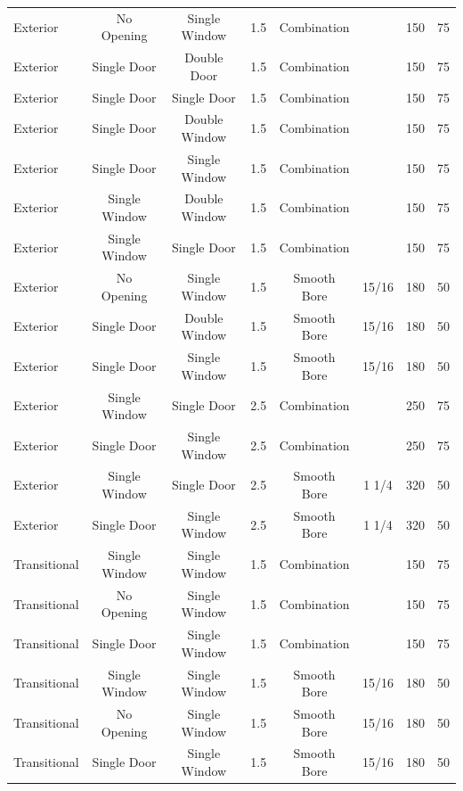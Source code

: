\documentclass[12pt,oneside]{book}
\begin{document}
\begin{table}[!ht]
\begin{tabular}{lccccccc}
Exterior & No Opening & Single Window & 1.5 & Combination &  & 150 & 75 \\
Exterior & Single Door & Double Door & 1.5 & Combination &  & 150 & 75 \\
Exterior & Single Door & Single Door & 1.5 & Combination &  & 150 & 75 \\
Exterior & Single Door & Double Window & 1.5 & Combination &  & 150 & 75 \\
Exterior & Single Door & Single Window & 1.5 & Combination &  & 150 & 75 \\
Exterior & Single Window & Double Window & 1.5 & Combination &  & 150 & 75 \\
Exterior & Single Window & Single Door & 1.5 & Combination &  & 150 & 75 \\
Exterior & No Opening & Single Window & 1.5 & Smooth Bore & 15/16 & 180 & 50 \\
Exterior & Single Door & Double Window & 1.5 & Smooth Bore & 15/16 & 180 & 50 \\
Exterior & Single Door & Single Window & 1.5 & Smooth Bore & 15/16 & 180 & 50 \\
Exterior & Single Window & Single Door & 2.5 & Combination &  & 250 & 75 \\
Exterior & Single Door & Single Window & 2.5 & Combination &  & 250 & 75 \\
Exterior & Single Window & Single Door & 2.5 & Smooth Bore & 1 1/4 & 320 & 50 \\
Exterior & Single Door & Single Window & 2.5 & Smooth Bore & 1 1/4 & 320 & 50 \\
Transitional & Single Window & Single Window & 1.5 & Combination &  & 150 & 75 \\
Transitional & No Opening & Single Window & 1.5 & Combination &  & 150 & 75 \\
Transitional & Single Door & Single Window & 1.5 & Combination &  & 150 & 75 \\
Transitional & Single Window & Single Window & 1.5 & Smooth Bore & 15/16 & 180 & 50 \\
Transitional & No Opening & Single Window & 1.5 & Smooth Bore & 15/16 & 180 & 50 \\
Transitional & Single Door & Single Window & 1.5 & Smooth Bore & 15/16 & 180 & 50 \\ 
\bottomrule[1.25pt]
\end{tabular}
\end{table}

\clearpage
\end{document}
